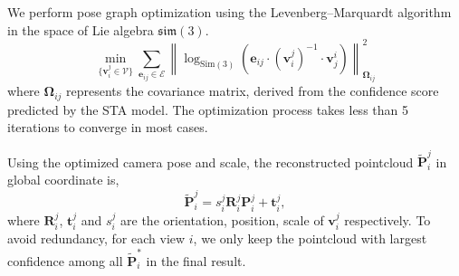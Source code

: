 We perform pose graph optimization using the Levenberg--Marquardt algorithm in the space of Lie algebra $\mathfrak{sim}(3)$.
\begin{equation}
\min_{\{\bm v_i^j \in \mathcal{V}\}} \sum_{\bm e_{ij} \in \mathcal{E}}
\left\|
\log_{\mathrm{Sim}(3)}\left( \bm e_{ij} \cdot ({\bm{v}}_i^j)^{-1}\cdot {\bm{v}}_j^i \right)
\right\|_{\bm \Omega_{ij}}^2
\end{equation}
where $\bm \Omega_{ij}$ represents the covariance matrix, derived from the confidence score predicted by the STA model. The optimization process takes less than 5 iterations to converge in most cases.

Using the optimized camera pose and scale, the reconstructed pointcloud $\tilde{\bm P}_i^j$ in global coordinate is,
\begin{equation}
    \tilde{\bm P}_i^j = s_i^j \bm R_i^j \bm P_i^j + \bm t_i^j,
\end{equation}
where $\bm R_i^j$, $\bm t_i^j$ and $s_i^j$ are the orientation, position, scale of $\bm v_i^j$ respectively. To avoid redundancy, for each view $i$, we only keep the pointcloud with largest confidence among all $\tilde{\bm P}_i^*$ in the final result.
